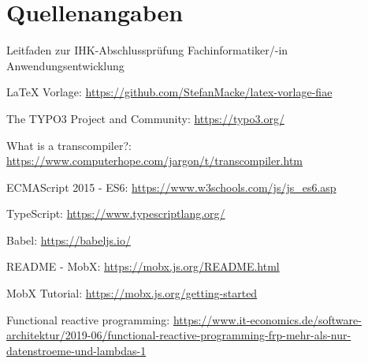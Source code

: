 \section{Quellenangaben}

Leitfaden zur IHK-Abschlussprüfung Fachinformatiker/-in Anwendungsentwicklung

LaTeX Vorlage: \url{https://github.com/StefanMacke/latex-vorlage-fiae}

The TYPO3 Project and Community: \url{https://typo3.org/}

What is a transcompiler?: \url{https://www.computerhope.com/jargon/t/transcompiler.htm}

ECMAScript 2015 - ES6: \url{https://www.w3schools.com/js/js_es6.asp}

TypeScript: \url{https://www.typescriptlang.org/}

Babel: \url{https://babeljs.io/}

README - MobX: \url{https://mobx.js.org/README.html}

MobX Tutorial: \url{https://mobx.js.org/getting-started}

Functional reactive programming: \url{https://www.it-economics.de/software-architektur/2019-06/functional-reactive-programming-frp-mehr-als-nur-datenstroeme-und-lambdas-1}
